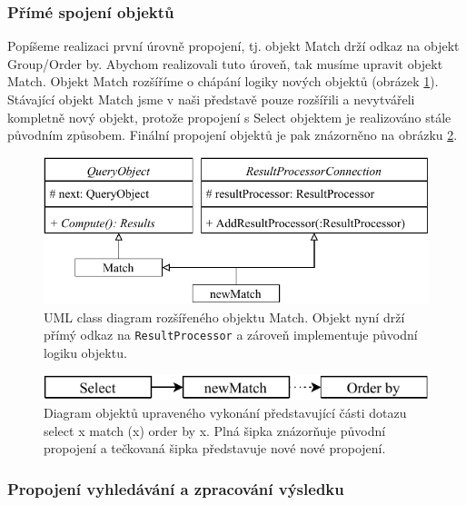 \subsubsection{Přímé spojení objektů}

Popíšeme realizaci první úrovně propojení, tj. objekt Match drží odkaz na objekt Group/Order by.
Abychom realizovali tuto úroveň, tak musíme upravit objekt Match.
Objekt Match rozšíříme o chápání logiky nových objektů (obrázek \ref{figure.diaStreamedQueryObjects}).
Stávající objekt Match jsme v naši představě pouze rozšířili a nevytvářeli kompletně nový objekt, protože propojení s Select objektem je realizováno stále původním způsobem.
Finální propojení objektů je pak znázorněno na obrázku \ref{figure.diaStreamedQueryObjectsCon}.

\begin{figure}[!htp]
\includegraphics{../img/diaStreamedQueryObjects.pdf}\centering
\caption{UML class diagram rozšířeného objektu Match. Objekt nyní drží přímý odkaz na \texttt{ResultProcessor} a zároveň implementuje původní logiku objektu.}
\label{figure.diaStreamedQueryObjects}
\end{figure}

\begin{figure}[!htp]
\includegraphics{../img/diaStreamedQueryObjectsCon.pdf}\centering
\caption{Diagram objektů upraveného vykonání představující části dotazu select x match (x) order by x. Plná šipka znázorňuje původní propojení a tečkovaná šipka představuje nové nové propojení.}
\label{figure.diaStreamedQueryObjectsCon}
\end{figure}


\subsubsection{Propojení vyhledávání a zpracování výsledku}

